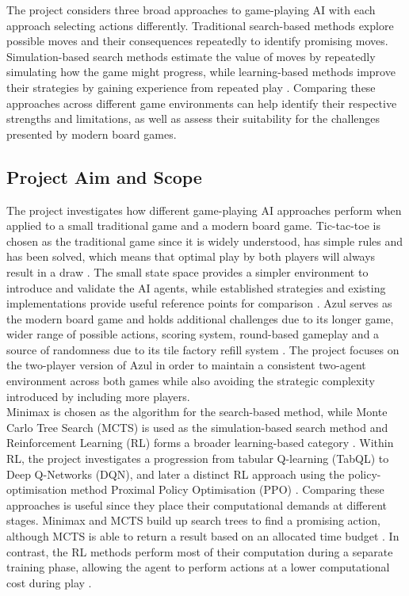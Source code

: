 The project considers three broad approaches to game-playing AI with each approach selecting actions differently. Traditional search-based methods explore possible moves and their consequences repeatedly to identify promising moves. Simulation-based search methods estimate the value of moves by repeatedly simulating how the game might progress, while learning-based methods improve their strategies by gaining experience from repeated play \cite{yannakakis2025artificial}. Comparing these approaches across different game environments can help identify their respective strengths and limitations, as well as assess their suitability for the challenges presented by modern board games.


\subsection{Project Aim and Scope}
The project investigates how different game-playing AI approaches perform when applied to a small traditional game and a modern board game. Tic-tac-toe is chosen as the traditional game since it is widely understood, has simple rules and has been solved, which means that optimal play by both players will always result in a draw \cite{tictactoesolved}. The small state space provides a simpler environment to introduce and validate the AI agents, while established strategies and existing implementations provide useful reference points for comparison \cite{tictactoeexisting}. Azul serves as the modern board game and holds additional challenges due to its longer game, wider range of possible actions, scoring system, round-based gameplay and a source of randomness due to its tile factory refill system \cite{azulrulebook}. The project focuses on the two-player version of Azul in order to maintain a consistent two-agent environment across both games while also avoiding the strategic complexity introduced by including more players.\\

Minimax is chosen as the algorithm for the search-based method, while Monte Carlo Tree Search (MCTS) is used as the simulation-based search method and Reinforcement Learning (RL) forms a broader learning-based category \cite{yannakakis2025artificial}. Within RL, the project investigates a progression from tabular Q-learning (TabQL) to Deep Q-Networks (DQN), and later a distinct RL approach using the policy-optimisation method Proximal Policy Optimisation (PPO) \cite{yannakakis2025artificial}. Comparing these approaches is useful since they place their computational demands at different stages. Minimax and MCTS build up search trees to find a promising action, although MCTS is able to return a result based on an allocated time budget \cite{mctshistory}. In contrast, the RL methods perform most of their computation during a separate training phase, allowing the agent to perform actions at a lower computational cost during play \cite{yannakakis2025artificial}. \\

